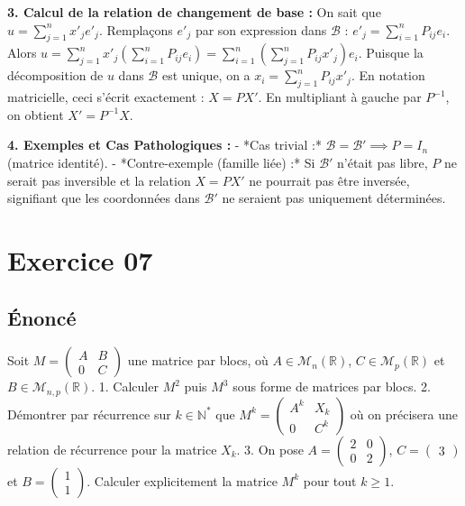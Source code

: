 \documentclass{report}
\begin{document}
\textbf{3. Calcul de la relation de changement de base :}
On sait que $u = \sum_{j=1}^n x'_j e'_j$.
Remplaçons $e'_j$ par son expression dans $\mathcal{B}$ : $e'_j = \sum_{i=1}^n P_{ij} e_i$.
Alors $u = \sum_{j=1}^n x'_j \left( \sum_{i=1}^n P_{ij} e_i \right) = \sum_{i=1}^n \left( \sum_{j=1}^n P_{ij} x'_j \right) e_i$.
Puisque la décomposition de $u$ dans $\mathcal{B}$ est unique, on a $x_i = \sum_{j=1}^n P_{ij} x'_j$.
En notation matricielle, ceci s'écrit exactement : $X = P X'$.
En multipliant à gauche par $P^{-1}$, on obtient $X' = P^{-1} X$.

\textbf{4. Exemples et Cas Pathologiques :}
- *Cas trivial :* $\mathcal{B} = \mathcal{B}' \implies P = I_n$ (matrice identité).
- *Contre-exemple (famille liée) :* Si $\mathcal{B}'$ n'était pas libre, $P$ ne serait pas inversible et la relation $X = P X'$ ne pourrait pas être inversée, signifiant que les coordonnées dans $\mathcal{B}'$ ne seraient pas uniquement déterminées.


\section*{Exercice 07}
\subsection*{Énoncé}
Soit $M = \begin{pmatrix} A & B \\ 0 & C \end{pmatrix}$ une matrice par blocs, où $A \in \mathcal{M}_n(\mathbb{R})$, $C \in \mathcal{M}_p(\mathbb{R})$ et $B \in \mathcal{M}_{n,p}(\mathbb{R})$.
1. Calculer $M^2$ puis $M^3$ sous forme de matrices par blocs.
2. Démontrer par récurrence sur $k \in \mathbb{N}^*$ que $M^k = \begin{pmatrix} A^k & X_k \\ 0 & C^k \end{pmatrix}$ où on précisera une relation de récurrence pour la matrice $X_k$.
3. On pose $A = \begin{pmatrix} 2 & 0 \\ 0 & 2 \end{pmatrix}$, $C = \begin{pmatrix} 3 \end{pmatrix}$ et $B = \begin{pmatrix} 1 \\ 1 \end{pmatrix}$. Calculer explicitement la matrice $M^k$ pour tout $k \ge 1$.
\end{document}
